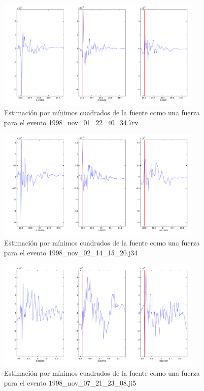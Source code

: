 \begin{figure}[H]
\includegraphics[width=0.9\textwidth,height=0.4\textheight]{linea_timerev/figuras/plotSrcEv13src.pdf}
\caption{Estimación por mínimos cuadrados de la fuente como una fuerza para el
evento 1998\_nov\_01\_22\_40\_34.7rv}
\end{figure}
\begin{figure}[H]
\includegraphics[width=0.9\textwidth,height=0.4\textheight]{linea_timerev/figuras/plotSrcEv14src.pdf}
\caption{Estimación por mínimos cuadrados de la fuente como una fuerza para el
evento 1998\_nov\_02\_14\_15\_20.j34}
\end{figure}
\begin{figure}[H]
\includegraphics[width=0.9\textwidth,height=0.4\textheight]{linea_timerev/figuras/plotSrcEv15src.pdf}
\caption{Estimación por mínimos cuadrados de la fuente como una fuerza para el
evento 1998\_nov\_07\_21\_23\_08.ji5}
\end{figure}
